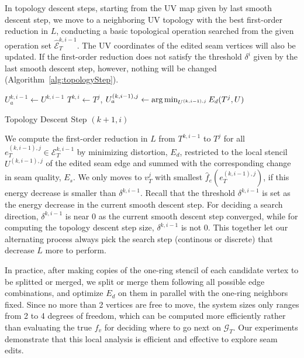 In topology descent steps, starting from the UV map given by last smooth descent step, we move to a neighboring UV topology with the best first-order reduction in $L$, conducting a basic topological operation searched from the given operation set $\hat{\mathcal{E}}^{k,i-1}_T$. The UV coordinates of the edited seam vertices will also be updated. If the first-order reduction does not satisfy the threshold $\delta^i$ given by the last smooth descent step, however, nothing will be changed (Algorithm~\ref{alg:topologyStep}).

\begin{algorithm}[h]
\SetAlgoLined
{}
$U_a^{k,i-1} \leftarrow U^{k,i-1}$\;
{
  $T^{k,i} \leftarrow T^j$, $U_a^{(k,i-1),j} \leftarrow \operatorname*{arg\,min}_{U^{(k,i-1),j}} E_d(T^j,U)$\;
}
\caption{Topology Descent Step $(k+1,i)$}
\label{alg:topologyStep}
\end{algorithm}
 
We compute the first-order reduction  in $L$ from $T^{k,i-1}$ to $T^j$ for all $e^{(k,i-1),j}_T \in \mathcal{E}^{k,i-1}_T$ by minimizing distortion, $E_d$, restricted to the local stencil $U^{(k,i-1),j}$ of the edited seam edge and summed with the corresponding change in seam quality, $E_s$. We only moves to  $v^j_T$ with smallest $\hat{f}_e(e^{(k,i-1),j}_{T})$, if this energy decrease is smaller than $\delta^{k,i-1}$. Recall that the threshold $\delta^{k,i-1}$ is set as the energy decrease in the current smooth descent step. For deciding a search direction, $\delta^{k,i-1}$ is near $0$ as the current smooth descent step converged, while for computing the topology descent step size, $\delta^{k,i-1}$ is not $0$. This together let our alternating process always pick the search step (continous or discrete) that decrease $L$ more to perform.

In practice, after making copies of the one-ring stencil of each candidate vertex to be splitted or merged, we split or merge them following all possible edge combinations, and optimize $E_d$ on them in parallel with the one-ring neighbors fixed. Since no more than 2 vertices are free to move, the system sizes only ranges from 2 to 4 degrees of freedom, which can be computed more efficiently rather than evaluating the true $f_v$ for deciding where to go next on $\mathcal{G}_T$. Our experiments demonstrate that this local analysis is efficient and effective to explore seam edits.

